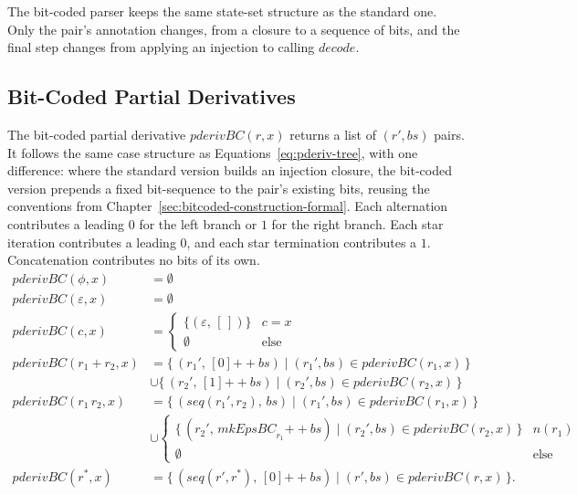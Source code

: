 The bit-coded parser keeps the same state-set structure as the standard one.
Only the pair's annotation changes, 
from a closure to a sequence of bits, 
and the final step changes from applying an injection to calling $\mathit{decode}$.

%
%
%

\clearpage
\subsection{Bit-Coded Partial Derivatives}
\label{sec:pderiv-bc-theory}

The bit-coded partial derivative $\mathit{pderivBC}(r, x)$
returns a list of $(r', bs)$ pairs.
It follows the same case structure as Equations~\eqref{eq:pderiv-tree}, 
with one difference:
where the standard version builds an injection closure, 
the bit-coded version prepends a fixed bit-sequence to the pair's existing bits,
reusing the conventions from Chapter~\ref{sec:bitcoded-construction-formal}. 
Each alternation contributes a leading $0$ 
for the left branch or $1$ for the right branch. 
Each star iteration contributes a leading $0$, 
and each star termination contributes a $1$. 
Concatenation contributes no bits of its own.
\begin{equation}\label{eq:pderiv-bc}
\begin{aligned}
\mathit{pderivBC}(\phi, x) &= \emptyset \\
\mathit{pderivBC}(\varepsilon, x) &= \emptyset \\
\mathit{pderivBC}(c, x) &=
  \begin{cases}
    \{(\varepsilon,\, [\,])\} & c = x \\
    \emptyset & \text{else}
  \end{cases} \\[4pt]
\mathit{pderivBC}(r_1 + r_2, x) &=
  \{\,(r_1',\, [0] \mathbin{+\!\!+} bs)
    \mid (r_1', bs) \in \mathit{pderivBC}(r_1, x)\,\} \\
  &\cup \{\,(r_2',\, [1] \mathbin{+\!\!+} bs)
    \mid (r_2', bs) \in \mathit{pderivBC}(r_2, x)\,\} \\[4pt]
\mathit{pderivBC}(r_1\,r_2, x) &=
  \{\,(\mathit{seq}(r_1', r_2),\, bs)
    \mid (r_1', bs) \in \mathit{pderivBC}(r_1, x)\,\} \\
  &\cup \begin{cases}
    \{\,(r_2',\, \mathit{mkEpsBC}_{r_1} \mathbin{+\!\!+} bs)
      \mid (r_2', bs) \in \mathit{pderivBC}(r_2, x)\,\} & n(r_1) \\
    \emptyset & \text{else}
  \end{cases} \\[4pt]
\mathit{pderivBC}(r^{*}, x) &=
  \{\,(\mathit{seq}(r', r^{*}),\, [0] \mathbin{+\!\!+} bs)
    \mid (r', bs) \in \mathit{pderivBC}(r, x)\,\}.
\end{aligned}
\end{equation}

